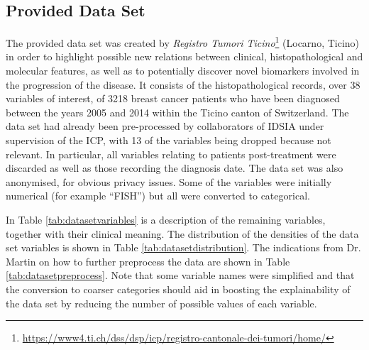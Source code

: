 \subsection{Provided Data Set}
The provided data set was created by \textit{Registro Tumori Ticino}\footnote{\url{https://www4.ti.ch/dss/dsp/icp/registro-cantonale-dei-tumori/home/}} (Locarno, Ticino) in order to highlight possible new relations between clinical, histopathological and molecular features, as well as to potentially discover novel biomarkers involved in the progression of the disease.
It consists of the histopathological records, over 38 variables of interest, of 3218 breast cancer patients who have been diagnosed between the years 2005 and 2014 within the Ticino canton of Switzerland.
The data set had already been pre-processed by collaborators of IDSIA under supervision of the ICP, with 13 of the variables being dropped because not relevant.
In particular, all variables relating to patients post-treatment were discarded as well as those recording the diagnosis date.
The data set was also anonymised, for obvious privacy issues.
Some of the variables were initially numerical (for example \enquote{FISH}) but all were converted to categorical.

In Table \ref{tab:datasetvariables} is a description of the remaining variables, together with their clinical meaning.
The distribution of the densities of the data set variables is shown in Table \ref{tab:datasetdistribution}.
The indications from Dr. Martin on how to further preprocess the data are shown in Table \ref{tab:datasetpreprocess}.
Note that some variable names were simplified and that the conversion to coarser categories should aid in boosting the explainability of the data set by reducing the number of possible values of each variable.

